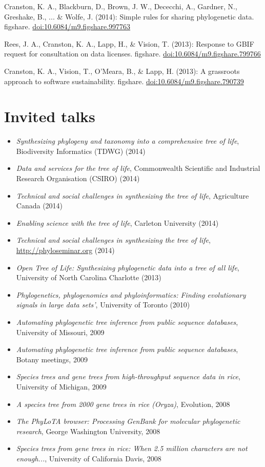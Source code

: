 \documentclass[10pt]{article}
\begin{document}
Cranston, K. A., Blackburn, D., Brown, J. W., Dececchi, A., Gardner, N., Greshake, B., ... \& Wolfe, J. (2014): Simple rules for sharing phylogenetic data. figshare. \href{http://dx.doi.org/10.6084/m9.figshare.997763}{doi:10.6084/m9.figshare.997763}

Rees, J. A., Cranston, K. A., Lapp, H., \& Vision, T. (2013): Response to GBIF request for consultation on data licenses. figshare. \href{http://dx.doi.org/10.6084/m9.figshare.799766}{doi:10.6084/m9.figshare.799766}

Cranston, K. A., Vision, T., O'Meara, B., \& Lapp, H. (2013): A grassroots approach to software sustainability. figshare.
\href{http://dx.doi.org/10.6084/m9.figshare.790739}{doi:10.6084/m9.figshare.790739}

\section*{Invited talks}
\begin{itemize}
\item{\textit{Synthesizing phylogeny and taxonomy into a comprehensive tree of life}, Biodiversity Informatics (TDWG) (2014)}
\item{\textit{Data and services for the tree of life}, Commonwealth Scientific and Industrial Research Organisation (CSIRO) (2014)}
\item{\textit{Technical and social challenges in synthesizing the tree of life}, Agriculture Canada (2014)}
\item{\textit{Enabling science with the tree of life}, Carleton University (2014)}
\item{\textit{Technical and social challenges in synthesizing the tree of life}, \url{http://phyloseminar.org} (2014)}
\item{\textit{Open Tree of Life: Synthesizing phylogenetic data into a tree of all life}, University of North Carolina Charlotte (2013)}
\item{\textit{Phylogenetics, phylogenomics and phyloinformatics: Finding evolutionary signals in large data sets'}, University of Toronto (2010)}
\item{\textit{Automating phylogenetic tree inference from public sequence databases}, University of Missouri, 2009} 
\item{\textit{Automating phylogenetic tree inference from public sequence databases}, Botany meetings, 2009} 
\item{\textit{Species trees and gene trees from high-throughput sequence data in rice}, University of Michigan, 2009}
\item{\textit{A species tree from 2000 gene trees in rice (Oryza)}, Evolution, 2008}
\item{\textit{The PhyLoTA browser: Processing GenBank for molecular phylogenetic research}, George Washington University, 2008}
\item{\textit{Species trees from gene trees in rice: When 2.5 million characters are not enough...}, University of California Davis, 2008}
\end{itemize}
\end{document}
